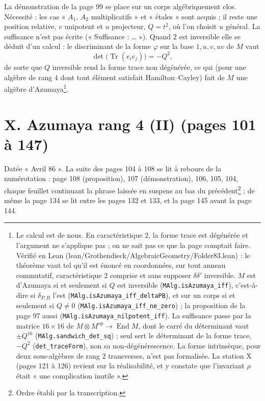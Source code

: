 \documentclass[11pt,a4paper]{article}
\begin{document}
La démonstration de la page 99 se place sur un corps algébriquement clos.
Nécessité : les cas « $A_1$, $A_2$ multiplicatifs » et « étales » sont acquis ;
il reste une position relative, $v$ unipotent et $u$ projecteur, $Q = t^2$, où
l'on choisit $u$ général. La suffisance n'est pas écrite (« Suffisance : … »).
Quand $2$ est inversible elle se déduit d'un calcul : le discriminant de la
forme $\varphi$ sur la base $1, u, v, uv$ de $M$ vaut
\[
  \det\bigl(\operatorname{Tr}(e_ie_j)\bigr) = -Q^2,
\]
de sorte que $Q$ inversible rend la forme trace non dégénérée, ce qui (pour une
algèbre de rang $4$ dont tout élément satisfait Hamilton--Cayley) fait de $M$
une algèbre d'Azumaya\footnote{Le calcul est de nous. En caractéristique $2$,
la forme trace est dégénérée et l'argument ne s'applique pas ; on ne sait pas
ce que la page comptait faire. Vérifié en Lean
(lean/Grothendieck/AlgebraicGeometry/Folder83.lean) : le théorème vaut tel qu'il est énoncé en
coordonnées, sur tout anneau commutatif, caractéristique $2$ comprise et sans
supposer $\delta\delta'$ inversible. $M$ est d'Azumaya si et seulement si $Q$
est inversible (\texttt{MAlg.isAzumaya\_iff}), c'est-à-dire si $\delta_{P,B}$
l'est (\texttt{MAlg.isAzumaya\_iff\_deltaPB}), et sur un corps si et
seulement si $Q \neq 0$ (\texttt{MAlg.isAzumaya\_iff\_ne\_zero}) ; la
proposition de la page 97 aussi (\texttt{MAlg.isAzumaya\_nilpotent\_iff}).
La suffisance passe par la matrice $16 \times 16$ de $M \otimes M^{\mathrm{op}}
\to \operatorname{End} M$, dont le carré du déterminant vaut $\pm Q^{16}$
(\texttt{MAlg.sandwich\_det\_sq}) ; seul sert le déterminant de la forme trace,
$-Q^2$ (\texttt{det\_traceForm}), non sa non-dégénérescence. La forme
intrinsèque, pour deux sous-algèbres de rang $2$ transverses, n'est pas
formalisée. La station X (pages 121 à 126) revient sur la
réalisabilité, et y constate que l'invariant $\rho$ était « une complication
inutile ».}.

\section*{X. Azumaya rang 4 (II) (pages 101 à 147)}

Datée « Avril 86 ». La suite des pages 104 à 108 se lit à rebours de la
numérotation : page 108 (proposition), 107 (démonstration), 106, 105, 104,
chaque feuillet continuant la phrase laissée en suspens au bas du
précédent\footnote{Ordre établi par la transcription.} ; de même la page 134 se
lit entre les pages 132 et 133, et la page 145 avant la page 144.
\end{document}
